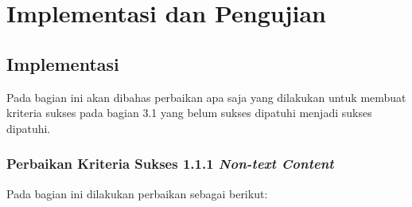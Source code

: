 \chapter{Implementasi dan Pengujian}
\label{chap:implementasi_dan_pengujian}

\section{Implementasi}
\label{sec:implementasi}
Pada bagian ini akan dibahas perbaikan apa saja yang dilakukan untuk membuat kriteria sukses pada bagian 3.1
yang belum sukses dipatuhi menjadi sukses dipatuhi.

\subsection{Perbaikan Kriteria Sukses 1.1.1 \textit{Non-text Content}}
\label{subsec:perbaikan_kriteria_sukses_1.1.1}
Pada bagian ini dilakukan perbaikan sebagai berikut:

